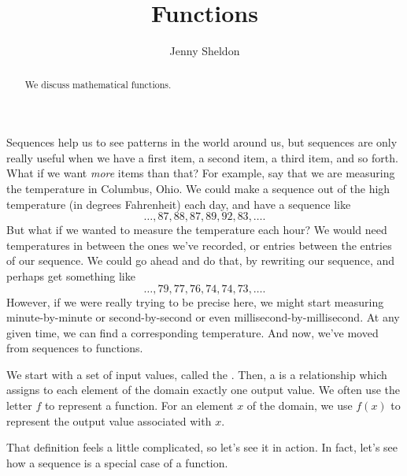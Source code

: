 \documentclass{ximera}
\title{Functions}
\author{Jenny Sheldon}
\begin{document}
\begin{abstract}
We discuss mathematical functions.
\end{abstract}
\maketitle

Sequences help us to see patterns in the world around us, but sequences are only really useful when we have a first item, a second item, a third item, and so forth. What if we want \emph{more} items than that? For example, say that we are measuring the temperature in Columbus, Ohio. We could make a sequence out of the high temperature (in degrees Fahrenheit) each day, and have a sequence like
\[
\dots, 87, 88, 87, 89, 92, 83, \dots.
\]
But what if we wanted to measure the temperature each hour? We would need temperatures in between the ones we've recorded, or entries between the entries of our sequence. We could go ahead and do that, by rewriting our sequence, and perhaps get something like
\[
\dots, 79, 77, 76, 74, 74, 73, \dots.
\]
However, if we were really trying to be precise here, we might start measuring minute-by-minute or second-by-second or even millisecond-by-millisecond. At any given time, we can find a corresponding temperature. And now, we've moved from sequences to functions.
\begin{definition}
We start with a set of input values, called the . Then, a  is a relationship which assigns to each element of the domain exactly one output value. We often use the letter $f$ to represent a function. For an element $x$ of the domain, we use $f(x)$ to represent the output value associated with $x$.
\end{definition}
That definition feels a little complicated, so let's see it in action. In fact, let's see how a sequence is a special case of a function.
\end{document}
